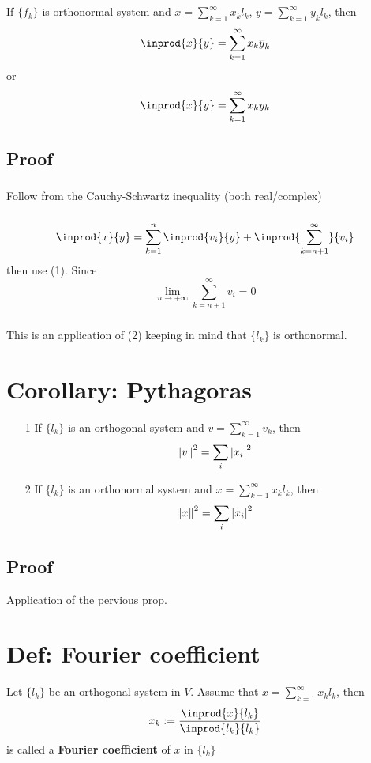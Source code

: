 \documentclass{book}
\newcommand{\abs}[1]{\left\lvert #1 \right\rvert}
\begin{document}
\subsection*{}If $\{f_k\}$ is orthonormal system and $ x=\sum\limits_{k=1}^\infty x_kl_k$, $y=\sum\limits_{k=1}^\infty y_kl_k$, then $$\inprod{x}{y}=\sum\limits_{k=1}^\infty x_k\overline y_k$$or$$\inprod{x}{y}=\sum\limits_{k=1}^\infty x_ky_k$$
\subsection*{Proof}
\subsubsection{}Follow from the Cauchy-Schwartz inequality (both real/complex)
\subsubsection{}$$\inprod{x}{y}=\sum\limits_{k=1}^n\inprod{v_i}{y}+\inprod{\sum\limits_{k=n+1}^\infty}{v_i}$$ then use (1). Since $$\lim\limits_{n\rightarrow+\infty}\sum\limits_{k=n+1}^\infty v_i=0$$
\subsubsection{}This is an application of (2) keeping in mind that $\{l_k\}$ is orthonormal.
\section{Corollary: Pythagoras}
\label{Pythagoras}
\begin{itemize}
    \item [1]If $\{l_k\}$ is an orthogonal system and $v=\sum\limits_{k=1}^\infty v_k$, then$$\norm{v}^2=\sum\limits_i\abs{x_i}^2$$
    \item [2]If $\{l_k\}$ is an orthonormal system and $x=\sum\limits_{k=1}^\infty x_kl_k$, then$$\norm{x}^2=\sum\limits_i\abs{x_i}^2$$
\end{itemize}
\subsection*{Proof}Application of the pervious prop.
\section{Def: Fourier coefficient}
Let $\{l_k\}$ be an orthogonal system in $V$. Assume that $x=\sum\limits_{k=1}^\infty x_kl_k$, then $$x_k:=\frac{\inprod{x}{l_k}}{\inprod{l_k}{l_k}}$$
is called a \textbf{Fourier coefficient} of $x$ in $\{l_k\}$
\end{document}
